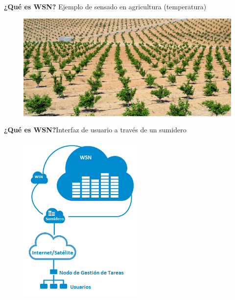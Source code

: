 \documentclass[aspectratio=43, handout]{beamer}
\begin{document}
\begin{frame}{\textbf{\LARGE{¿Qué es WSN?}}}
\fontsize{15pt}{15}\selectfont
		\noindent Ejemplo de sensado en agricultura (temperatura)
		\begin{figure}[H]			
		\includegraphics[width=1\textwidth]{./imagenes/plantaciones-de-citricos-1.jpg}
		\end{figure}	  	  	
\end{frame}



\begin{frame}{\textbf{\LARGE{¿Qué es WSN?}}}{\LARGE{Interfaz de usuario a través de un sumidero}}
\fontsize{15pt}{15}\selectfont
		\begin{figure}[H]			
		\includegraphics[width=0.55\textwidth]{./imagenes/RedDistribuida.png}
		\end{figure}	  	  	
\end{frame}

\end{document}
